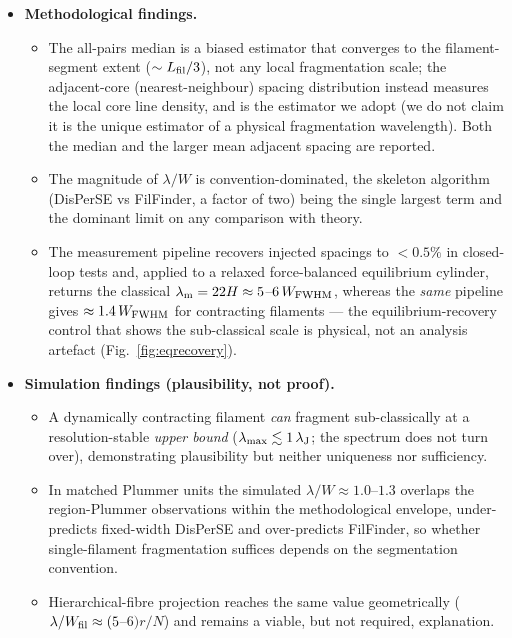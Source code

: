 \documentclass[usenatbib,twoside,twocolumn]{mnras}
\begin{document}
\begin{itemize}
    \item \textbf{Methodological findings.}
    \begin{itemize}
        \item The all-pairs median is a biased estimator that converges to the filament-segment extent ($\sim L_{\rm fil}/3$), not any local fragmentation scale; the adjacent-core (nearest-neighbour) spacing distribution instead measures the local core line density, and is the estimator we adopt (we do not claim it is the unique estimator of a physical fragmentation wavelength). Both the median and the larger mean adjacent spacing are reported.
        \item The magnitude of $\lambda/W$ is convention-dominated, the skeleton algorithm (DisPerSE vs FilFinder, a factor of two) being the single largest term and the dominant limit on any comparison with theory.
        \item The measurement pipeline recovers injected spacings to $<0.5\%$ in closed-loop tests and, applied to a relaxed force-balanced equilibrium cylinder, returns the classical $\lambda_{\rm m}=22H\approx5$--$6\,W_{\rm FWHM}$, whereas the \emph{same} pipeline gives $\approx1.4\,W_{\rm FWHM}$ for contracting filaments --- the equilibrium-recovery control that shows the sub-classical scale is physical, not an analysis artefact (Fig.~\ref{fig:eqrecovery}).
    \end{itemize}

    \item \textbf{Simulation findings (plausibility, not proof).}
    \begin{itemize}
        \item A dynamically contracting filament \emph{can} fragment sub-classically at a resolution-stable \emph{upper bound} ($\lambda_{\rm max}\lesssim1\,\lambda_{\rm J}$; the spectrum does not turn over), demonstrating plausibility but neither uniqueness nor sufficiency.
        \item In matched Plummer units the simulated $\lambda/W\approx1.0$--$1.3$ overlaps the region-Plummer observations within the methodological envelope, under-predicts fixed-width DisPerSE and over-predicts FilFinder, so whether single-filament fragmentation suffices depends on the segmentation convention.
        \item Hierarchical-fibre projection reaches the same value geometrically ($\lambda/W_{\rm fil}\approx(5$--$6)r/N$) and remains a viable, but not required, explanation.
    \end{itemize}


\end{itemize}
\end{document}
